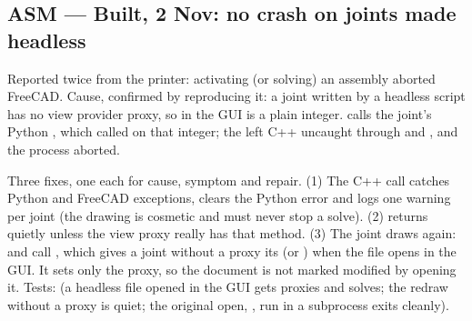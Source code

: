 \subsection{ASM --- Built, 2 Nov: no crash on joints made headless}\label{sec:asm-joint-crash-built}

Reported twice from the printer: activating (or solving) an assembly aborted FreeCAD. Cause, confirmed by
reproducing it: a joint written by a headless  script has no view provider proxy, so in the GUI
 is a plain integer.  calls the joint's Python
, which called  on that integer; the
 left C++ uncaught through  and , and the process aborted.

Three fixes, one each for cause, symptom and repair. (1) The C++ call catches Python and FreeCAD exceptions, clears
the Python error and logs one warning per joint (the drawing is cosmetic and must never stop a solve). (2)
 returns quietly unless the view proxy really has that method. (3) The joint draws
again:  and  call ,
which gives a joint without a proxy its  (or ) when the file
opens in the GUI. It sets only the proxy, so the document is not marked modified by opening it. Tests:
 (a headless file opened in the GUI gets proxies and solves; the
redraw without a proxy is quiet; the original open, ,  run in a subprocess exits cleanly).
